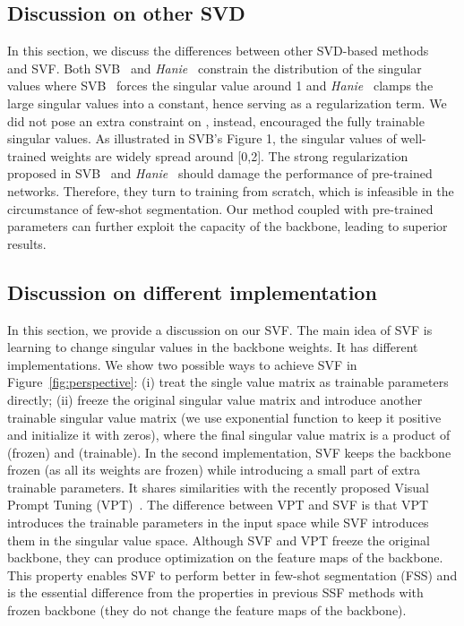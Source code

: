 \documentclass{article}
\begin{document}
\subsection{Discussion on other SVD}
In this section, we discuss the differences between other SVD-based methods~\cite{jia2017improving,sedghi2018singular} and SVF. Both SVB~\cite{jia2017improving} and \emph{Hanie}~\cite{sedghi2018singular} constrain the distribution of the singular values  where SVB~\cite{jia2017improving} forces the singular value around 1 and \emph{Hanie}~\cite{sedghi2018singular} clamps the large singular values into a constant, hence serving as a regularization term. We did not pose an extra constraint on , instead, encouraged the fully trainable singular values. As illustrated in SVB's Figure 1, the singular values of well-trained weights are widely spread around [0,2]. The strong regularization proposed in  SVB~\cite{jia2017improving} and \emph{Hanie}~\cite{sedghi2018singular} should damage the performance of pre-trained networks. Therefore, they turn to training from scratch, which is infeasible in the circumstance of few-shot segmentation. Our method coupled with pre-trained parameters can further exploit the capacity of the backbone, leading to superior results.


\subsection{Discussion on different implementation}

In this section, we provide a discussion on our SVF. The main idea of SVF is learning to change singular values in the backbone weights. It has different implementations. We show two possible ways to achieve SVF in Figure~\ref{fig:perspective}: (i) treat the single value matrix  as trainable parameters directly; (ii) freeze the original singular value matrix  and introduce another trainable singular value matrix  (we use exponential function {\em } to keep it positive and initialize it with zeros), where the final singular value matrix is a product of  (frozen) and  (trainable). In the second implementation, SVF keeps the backbone frozen (as all its weights are frozen) while introducing a small part of extra trainable parameters. It shares similarities with the recently proposed Visual Prompt Tuning (VPT)~\cite{jia2022visual}. The difference between VPT and SVF is that VPT introduces the trainable parameters in the input space while SVF introduces them in the singular value space. Although SVF and VPT freeze the original backbone, they can produce optimization on the feature maps of the backbone. This property enables SVF to perform better in few-shot segmentation (FSS) and is the essential difference from the properties in previous SSF methods with frozen backbone (they do not change the feature maps of the backbone).
\end{document}
